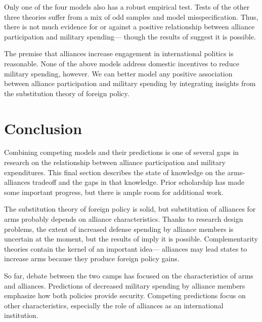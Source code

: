 \documentclass[12pt]{article}
\begin{document}
Only one of the four models also has a robust empirical test. 
Tests of the other three theories suffer from a mix of odd samples and model misspecification. 
Thus, there is not much evidence for or against a positive relationship between alliance participation and military spending--- though the results of \citet{Horowitzetal2017} suggest it is possible. 


The premise that alliances increase engagement in international politics is reasonable. 
None of the above models address domestic incentives to reduce military spending, however. 
We can better model any positive association between alliance participation and military spending by integrating insights from the substitution theory of foreign policy. 




\section{Conclusion}


Combining competing models and their predictions is one of several gaps in research on the relationship between alliance participation and military expenditures. 
This final section describes the state of knowledge on the arms-alliances tradeoff and the gaps in that knowledge. 
Prior scholarship has made some important progress, but there is ample room for additional work. 


The substitution theory of foreign policy is solid, but substitution of alliances for arms probably depends on alliance characteristics. 
Thanks to research design problems, the extent of increased defense spending by alliance members is uncertain at the moment, but the results of \citet{Horowitzetal2017} imply it is possible. 
Complementarity theories contain the kernel of an important idea--- alliances may lead states to increase arms because they produce foreign policy gains. 


So far, debate between the two camps has focused on the characteristics of arms and alliances. 
Predictions of decreased military spending by alliance members emphasize how both policies provide security. 
Competing predictions focus on other characteristics, especially the role of alliances as an international institution. 
\end{document}
